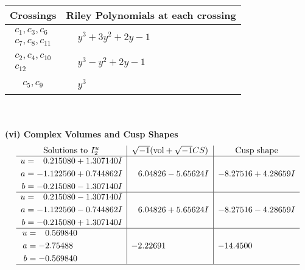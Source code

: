\documentclass[1p]{elsarticle_modified}
\theoremstyle{definition}
\newcommand{\I}{\sqrt{-1}}
\begin{document}
\begin{tabular}{m{50pt}|m{274pt}}
Crossings & \hspace{64pt}Riley Polynomials at each crossing \\
\hline $$\begin{aligned}c_{1},c_{3},c_{6}\\c_{7},c_{8},c_{11}\end{aligned}$$&$\begin{aligned}
&y^3+3 y^2+2 y-1
\end{aligned}$\\
\hline $$\begin{aligned}c_{2},c_{4},c_{10}\\c_{12}\end{aligned}$$&$\begin{aligned}
&y^3- y^2+2 y-1
\end{aligned}$\\
\hline $$\begin{aligned}c_{5},c_{9}\end{aligned}$$&$\begin{aligned}
&y^3
\end{aligned}$\\
\hline
\end{tabular}\\~\\
\newpage\flushleft \textbf{(vi) Complex Volumes and Cusp Shapes}
$$\begin{array}{c|c|c}  
\text{Solutions to }I^u_{2}& \I (\text{vol} + \sqrt{-1}CS) & \text{Cusp shape}\\
 \hline 
\begin{aligned}
u &= \phantom{-}0.215080 + 1.307140 I \\
a &= -1.122560 + 0.744862 I \\
b &= -0.215080 - 1.307140 I\end{aligned}
 & \phantom{-}6.04826 - 5.65624 I & -8.27516 + 4.28659 I \\ \hline\begin{aligned}
u &= \phantom{-}0.215080 - 1.307140 I \\
a &= -1.122560 - 0.744862 I \\
b &= -0.215080 + 1.307140 I\end{aligned}
 & \phantom{-}6.04826 + 5.65624 I & -8.27516 - 4.28659 I \\ \hline\begin{aligned}
u &= \phantom{-}0.569840\phantom{ +0.000000I} \\
a &= -2.75488\phantom{ +0.000000I} \\
b &= -0.569840\phantom{ +0.000000I}\end{aligned}
 & -2.22691\phantom{ +0.000000I} & -14.4500\phantom{ +0.000000I}\\
 \hline 
 \end{array}$$\newpage\newpage\renewcommand{\arraystretch}{1}
\end{document}
